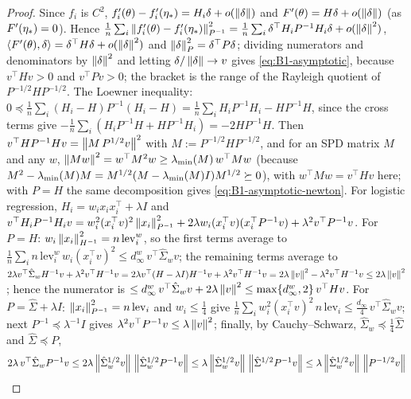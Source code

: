 \begin{proof}
Since $f_i$ is $C^2$, $f'_i(\theta)-f'_i(\eta_\ast)=H_i\delta+o(\left\|\delta\right\|)$ and
$F'(\theta)=H\delta+o(\left\|\delta\right\|)$ (as $F'(\eta_\ast)=0$). Hence
$\frac1n\sum_i\left\|f'_i(\theta)-f'_i(\eta_\ast)\right\|_{P^{-1}}^2=\frac1n\sum_i\delta^\top H_iP^{-1}H_i\delta+o(\left\|\delta\right\|^2)$,
$\left\langle F'(\theta), \delta \right\rangle=\delta^\top H\delta+o(\left\|\delta\right\|^2)$ and $\left\|\delta\right\|_P^2=\delta^\top P\delta$;
dividing numerators and denominators by $\left\|\delta\right\|^2$ and letting $\delta/\left\|\delta\right\|\to v$ gives
\eqref{eq:B1-asymptotic}, because $v^\top Hv>0$ and $v^\top Pv>0$; the bracket is the range of the
Rayleigh quotient of $P^{-1/2}HP^{-1/2}$. The Loewner inequality:
$0\preceq\frac1n\sum_i(H_i-H)P^{-1}(H_i-H)=\frac1n\sum_iH_iP^{-1}H_i-HP^{-1}H$, since the cross terms
give $-\frac1n\sum_i(H_iP^{-1}H+HP^{-1}H_i)=-2HP^{-1}H$. Then
$v^\top HP^{-1}Hv=\left\|M\,P^{1/2}v\right\|^2$ with $M:=P^{-1/2}HP^{-1/2}$, and for an SPD matrix $M$ and any $w$,
$\left\|Mw\right\|^2=w^\top M^2w\ge\lambda_{\min}(M)\,w^\top Mw$ (because $M^2-\lambda_{\min}(M)M=M^{1/2}(M-\lambda_{\min}(M)I)M^{1/2}\succeq0$),
with $w^\top Mw=v^\top Hv$ here; with $P=H$ the same decomposition gives \eqref{eq:B1-asymptotic-newton}.
For logistic regression, $H_i=w_ix_ix_i^\top+\lambda I$ and
$v^\top H_iP^{-1}H_iv=w_i^2(x_i^\top v)^2\left\|x_i\right\|_{P^{-1}}^2+2\lambda w_i(x_i^\top v)(x_i^\top P^{-1}v)+\lambda^2v^\top P^{-1}v$.
For $P=H$: $w_i\left\|x_i\right\|_{H^{-1}}^2=n\,\mathrm{lev}^w_i$, so the first terms average to
$\frac1n\sum_i n\,\mathrm{lev}^w_i\,w_i(x_i^\top v)^2\le d^w_\infty\,v^\top\hat\Sigma_wv$; the remaining terms average to
$2\lambda v^\top\hat\Sigma_wH^{-1}v+\lambda^2v^\top H^{-1}v=2\lambda v^\top(H-\lambda I)H^{-1}v+\lambda^2v^\top H^{-1}v
=2\lambda\left\|v\right\|^2-\lambda^2v^\top H^{-1}v\le2\lambda\left\|v\right\|^2$; hence the numerator is
$\le d^w_\infty\,v^\top\hat\Sigma_wv+2\lambda\left\|v\right\|^2\le\max\{d^w_\infty,2\}\,v^\top Hv$.
For $P=\hat\Sigma+\lambda I$: $\left\|x_i\right\|_{P^{-1}}^2=n\,\mathrm{lev}_i$ and $w_i\le\frac14$ give
$\frac1n\sum_iw_i^2(x_i^\top v)^2\,n\,\mathrm{lev}_i\le\frac{d_\infty}{4}\,v^\top\hat\Sigma_wv$; next
$P^{-1}\preceq\lambda^{-1}I$ gives $\lambda^2v^\top P^{-1}v\le\lambda\left\|v\right\|^2$; finally, by
Cauchy--Schwarz, $\hat\Sigma_w\preceq\frac14\hat\Sigma$ and $\hat\Sigma\preceq P$,
\begin{align*}
2\lambda\,v^\top\hat\Sigma_wP^{-1}v&\le2\lambda\norm{\hat\Sigma_w^{1/2}v}\,\norm{\hat\Sigma_w^{1/2}P^{-1}v}
\le\lambda\norm{\hat\Sigma_w^{1/2}v}\,\norm{\hat\Sigma^{1/2}P^{-1}v}
\le\lambda\norm{\hat\Sigma_w^{1/2}v}\,\norm{P^{-1/2}v}\\

\end{align*}
\end{proof}
